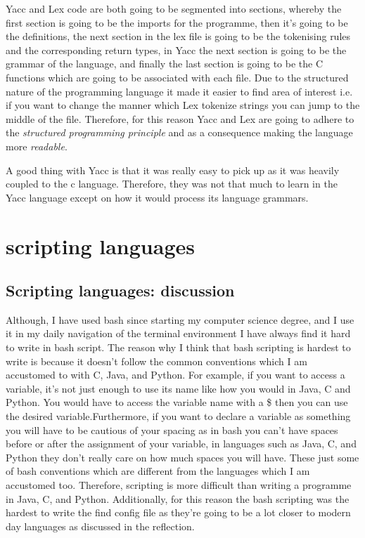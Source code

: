 \documentclass[
	12pt, %
]{fphw}
\begin{document}
Yacc and Lex code are both going to be segmented into sections, whereby the
first section is going to be the imports for the programme, then
it's going to be the definitions, the next section in the lex
file is going to be the tokenising rules and the corresponding return types,
in Yacc the next section is going to be the grammar of the
language, and finally the last section is going to be the C functions which are
going to be associated with each file. Due to the structured nature of the
programming language it made it easier to find area of interest i.e. if you want
to change the manner which Lex tokenize strings you can jump to the middle of the
file. Therefore, for this reason Yacc and Lex are going to adhere to the
\emph{structured programming principle} and as a consequence making the language
more \emph{readable}.\par

A good thing with Yacc is that it was really easy to pick up as it was heavily
coupled to the c language. Therefore, they was not that much to learn in the
Yacc language except on how it would process its language grammars.

\section{scripting languages}

\subsection{Scripting languages: discussion}
Although, I have used bash since starting my computer science
degree, and I use it in my daily navigation of the terminal environment I have
always find it hard to write in bash script. The reason why I think that bash
scripting is hardest to write is because it doesn't follow the common conventions
which I am accustomed to with C, Java, and Python. For example, if you want
to access a variable, it's not just enough to use its name like how you would
in Java, C and Python. You would have to access the variable name with a
\$ then you can use the desired variable.Furthermore,
if you want to declare a variable as something you will have to be cautious of your
spacing as in bash you can't have spaces before or after the assignment of your variable,
in languages such as Java, C, and Python they don't really care on how much spaces you
will have. These just some of bash conventions which are different from the
languages which I am accustomed too. Therefore, scripting is more difficult than
writing a programme in Java, C, and Python. Additionally, for this reason the
bash scripting was the hardest to write the find config file as they're going to
be a lot closer to modern day languages as discussed in the reflection.
\end{document}
